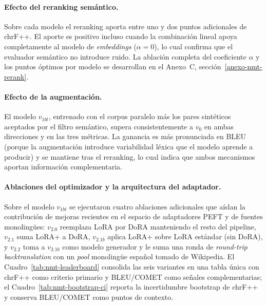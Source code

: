 \documentclass[12pt,a4paper,oneside]{book}
\begin{document}
\paragraph{Efecto del reranking semántico.} Sobre cada modelo el reranking aporta entre uno y dos puntos adicionales de chrF++. El aporte es positivo incluso cuando la combinación lineal apoya completamente al modelo de \emph{embeddings} (\(\alpha=0\)), lo cual confirma que el evaluador semántico no introduce ruido. La ablación completa del coeficiente \(\alpha\) y los puntos óptimos por modelo se desarrollan en el Anexo~C, sección~\ref{anexo-nmt-rerank}.

\paragraph{Efecto de la augmentación.} El modelo \(v_{1bt}\), entrenado con el corpus paralelo más los pares sintéticos aceptados por el filtro semántico, supera consistentemente a \(v_0\) en ambas direcciones y en las tres métricas. La ganancia es más pronunciada en BLEU (porque la augmentación introduce variabilidad léxica que el modelo aprende a producir) y se mantiene tras el reranking, lo cual indica que ambos mecanismos aportan información complementaria.

\paragraph{Ablaciones del optimizador y la arquitectura del adaptador.} Sobre el modelo \(v_{1bt}\) se ejecutaron cuatro ablaciones adicionales que aíslan la contribución de mejoras recientes en el espacio de adaptadores PEFT y de fuentes monolingües: \(v_{2.0}\) reemplaza LoRA por DoRA \parencite{liu2024dora} manteniendo el resto del pipeline, \(v_{2.1}\) suma LoRA+ \parencite{hayou2024loraplus} a DoRA, \(v_{2.1b}\) aplica LoRA+ sobre LoRA estándar (sin DoRA), y \(v_{2.2}\) toma a \(v_{2.1b}\) como modelo generador y le suma una ronda de \emph{round-trip backtranslation} con un \emph{pool} monolingüe español tomado de Wikipedia. El Cuadro~\ref{tab:nmt-leaderboard} consolida las seis variantes en una tabla única con chrF++ como criterio primario y BLEU/COMET como señales complementarias; el Cuadro~\ref{tab:nmt-bootstrap-ci} reporta la incertidumbre bootstrap de chrF++ y conserva BLEU/COMET como puntos de contexto.

\begin{table}[h]
\centering
\caption{\emph{Leaderboard} final de ablaciones sobre la variante \texttt{xl} (446 pares por dirección, 892 filas direccionales). chrF++ es la métrica primaria; BLEU y COMET se reportan como métricas complementarias.}
\label{tab:nmt-leaderboard}
\resizebox{\linewidth}{!}{}
\end{table}
\end{document}
